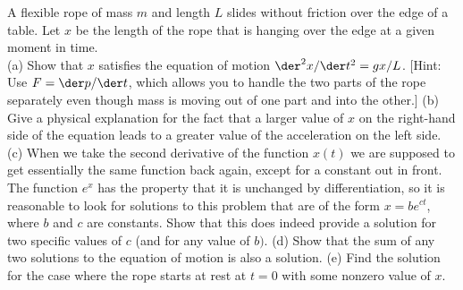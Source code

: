A flexible rope of mass $m$ and length $L$ slides
without friction over the edge of a table. Let $x$ be the
length of the rope that is hanging over the edge at a
given moment in time.\\
(a) Show that $x$ satisfies the equation of motion $\der^2x/\der t^2=gx/L$.
[Hint: Use $F=\der p/\der t$, which allows you to handle the two parts of the rope
separately even though mass is moving out of one part and into the other.]\hwendpart
(b) Give a physical explanation for the fact that a larger
value of $x$ on the right-hand side of the equation leads to
a greater value of the acceleration on the left side.\hwendpart
(c) When we take the second derivative of the function
$x(t)$ we are supposed to get essentially the same function
back again, except for a constant out in front. The function
$e^x$ has the property that it is unchanged by differentiation,
so it is reasonable to look for solutions to this problem
that are of the form $x=be^{ct}$, where $b$ and $c$ are
constants. Show that this does indeed provide a solution for
two specific values of $c$ (and for any value of $b)$.\hwendpart
(d) Show that the sum of any two solutions to the equation
of motion is also a solution.\hwendpart
(e) Find the solution for the case where the rope starts at
rest at $t=0$ with some nonzero value of $x$.
